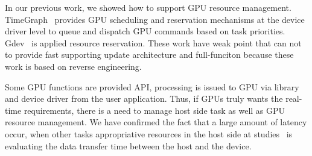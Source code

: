 In our previous work,
we showed how to support GPU resource management.
TimeGraph~\cite{kato:timegraph} provides GPU scheduling and reservation mechanisms at the device driver level to queue and dispatch GPU commands based on task priorities.
Gdev~\cite{kato:gdev} is applied resource reservation.
These work have weak point that can not to provide fast supporting update architecture and full-funciton because these work is based on reverse engineering.

Some GPU functions are provided API, processing is issued to GPU via library and device driver from the user application.
Thus, if GPUs truly wants the real-time requirements,  there is a need to manage host side task as well as GPU resource management.
We have confirmed the fact that a large amount of latency occur,
when other tasks appropriative resources in the host side at studies~\cite{fujii:icpads2013} is evaluating the data transfer time between the host and the device.

